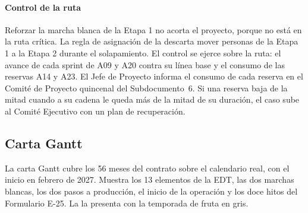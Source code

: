 \paragraph{Control de la ruta}
Reforzar la marcha blanca de la Etapa 1 no acorta el proyecto, porque no está en la ruta crítica. La
regla de asignación de la  descarta mover personas de la Etapa 1 a la
Etapa 2 durante el solapamiento. El control se ejerce sobre la ruta: el avance de cada sprint de A09 y
A20 contra su línea base y el consumo de las reservas A14 y A23. El Jefe de Proyecto informa el consumo
de cada reserva en el Comité de Proyecto quincenal del Subdocumento~6. Si una reserva baja de la mitad
cuando a su cadena le queda más de la mitad de su duración, el caso sube al Comité Ejecutivo con un
plan de recuperación.

\subsection{Carta Gantt}\label{sec:7-gantt}

La carta Gantt cubre los 56 meses del contrato sobre el calendario real, con el inicio en febrero de
2027. Muestra los 13 elementos de la EDT, las dos marchas blancas, los dos pasos a producción, el inicio
de la operación y los doce hitos del Formulario E-25. La  la presenta con la temporada de
fruta en gris.

